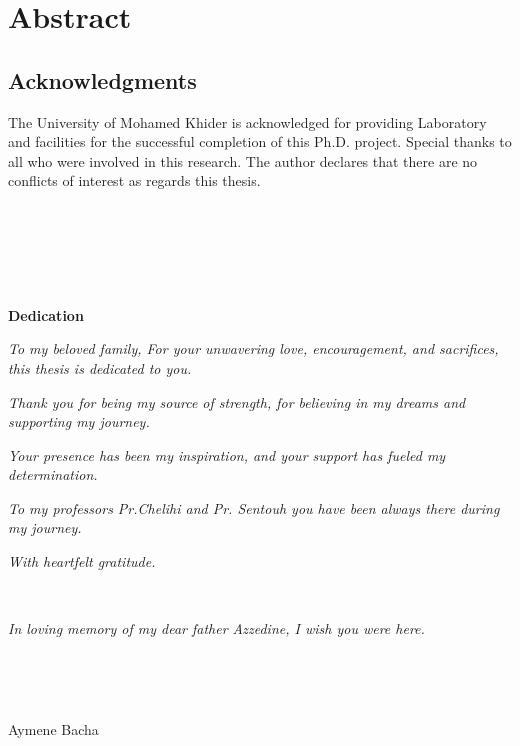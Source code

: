 


\cleardoublepage
\setcounter{savepage}{\thepage}

\chapter*{Abstract}


\section*{Acknowledgments}

The University of Mohamed Khider is acknowledged for providing Laboratory and facilities for the successful completion of this Ph.D. project. Special thanks to all who were involved in this research. The author declares that there are no conflicts of interest as regards this thesis.

\ 

\ 

\

\textbf{Dedication}

\textit{To my beloved family, For your unwavering love, encouragement, and sacrifices,
this thesis is dedicated to you.}


\textit{Thank you for being my source of strength, for believing in my dreams and supporting my journey.
}


\textit{Your presence has been my inspiration, and your support has fueled my determination.
}


\textit{To my professors Pr.Chelihi and Pr. Sentouh you have been always there during my journey.  
}


\textit{With heartfelt gratitude.
}

\

\textit{In loving memory of my dear father Azzedine, I wish you were here.
}

\

\

\hfill Aymene Bacha
